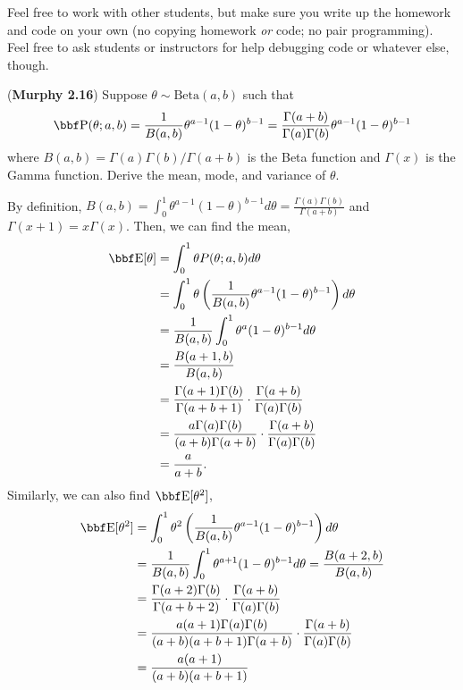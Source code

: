 \documentclass[12pt,letterpaper,fleqn]{hmcpset}
\begin{document}
Feel free to work with other students, but make sure you write up the homework
and code on your own (no copying homework \textit{or} code; no pair programming).
Feel free to ask students or instructors for help debugging code or whatever else,
though.

\begin{problem}[1]
(\textbf{Murphy 2.16}) Suppose $\theta \sim \text{Beta}(a,b)$ such
        that
        \[
            \PP(\theta; a,b) = \frac{1}{B(a,b)} \theta^{a-1}(1-\theta)^{b-1} = \frac{\Gamma(a+b)}{\Gamma(a)\Gamma(b)} \theta^{a-1}(1-\theta)^{b-1}
        \]
        where $B(a,b) = \Gamma(a)\Gamma(b)/\Gamma(a+b)$ is the Beta function
        and $\Gamma(x)$ is the Gamma function.
        Derive the mean, mode, and variance of $\theta$.
\end{problem}
\begin{solution}
By definition, $B(a, b) = \int_{0}^{1} \theta^{a-1}(1 - \theta)^{b-1}d\theta = \frac{\Gamma(a) \Gamma(b)}{\Gamma(a + b)}$ and $\Gamma(x + 1) = x \Gamma(x)$.
Then, we can find the mean,
\begin{align*}
	\EE[\theta] &= \int_{0}^{1} \theta P(\theta; a, b) d\theta \\
&= \int_{0}^{1} \theta \left( \frac{1}{B(a, b)} \theta^{a-1}(1 - \theta)^{b-1} \right) d\theta \\
&= \frac{1}{B(a, b)} \int_{0}^{1} \theta^{a}(1 - \theta)^{b-1} d\theta \\
&= \frac{B(a + 1, b)}{B(a, b)} \\
&= \frac{\Gamma(a + 1) \Gamma(b)}{\Gamma(a + b + 1)} \cdot \frac{\Gamma(a + b)}{\Gamma(a) \Gamma(b)} \\
&= \frac{a \Gamma(a) \Gamma(b)}{(a + b) \Gamma(a + b)} \cdot \frac{\Gamma(a + b)}{\Gamma(a) \Gamma(b)} \\
&= \frac{a}{a + b}. 
\end{align*}
Similarly, we can also find $\EE[\theta^2]$,
\begin{align*}
\EE[\theta^2] &= \int_{0}^{1} \theta^2 \left( \frac{1}{B(a, b)} \theta^{a-1}(1 - \theta)^{b-1} \right) d\theta \\
&= \frac{1}{B(a, b)} \int_{0}^{1} \theta^{a+1}(1 - \theta)^{b-1} d\theta = \frac{B(a + 2, b)}{B(a, b)} \\
&= \frac{\Gamma(a + 2) \Gamma(b)}{\Gamma(a + b + 2)} \cdot \frac{\Gamma(a + b)}{\Gamma(a) \Gamma(b)} \\
&= \frac{a(a + 1) \Gamma(a) \Gamma(b)}{(a + b)(a + b + 1)\Gamma(a + b)} \cdot \frac{\Gamma(a + b)}{\Gamma(a) \Gamma(b)} \\
&= \frac{a(a + 1)}{(a + b)(a + b + 1)}
\end{align*}


\end{solution}
\end{document}
